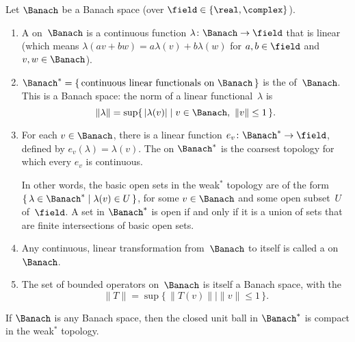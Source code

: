 \begin{defns} \label{WeakStarDefn}
Let $\Banach$ be a Banach space (over $\field \in \{\real, \complex\}$).
	\begin{enumerate}
	\item A  on~$\Banach$ is a continuous function $\lambda \colon \Banach \to \field$ that is linear (which means $\lambda (a v + b w) = a \lambda(v) + b \lambda(w)$ for $a,b \in \field$ and $v,w \in \Banach$).
	
	\item {}%
	$\Banach^* = \{\, \text{continuous linear functionals on~$\Banach$} \,\}$ is the  of~$\Banach$. This is a Banach space: the norm of a linear functional~$\lambda$ is
		$$ \| \lambda \| = \sup \{\, |\lambda(v)| \mid v \in \Banach, \ \|v\| \le 1 \,\} .$$
	
	\item For each $v \in \Banach$, there is a linear function $e_v \colon \Banach^* \to \field$, defined by $e_v(\lambda) = \lambda(v)$. The  on $\Banach^*$ is the coarsest topology for which every $e_v$ is continuous. 
	
	In other words, the basic open sets in the weak$^*$ topology are of the form 
		$ %
		\{\, \lambda \in \Banach^* \mid \lambda(v) \in U \,\}$, for some $v \in \Banach$ and some open subset~$U$ of~$\field$. A set in $\Banach^*$ is open if and only if it is a union of sets that are finite intersections of basic open sets.

	\item Any continuous, linear transformation from~$\Banach$ to itself is called a  on~$\Banach$.

	\item The set of bounded operators on~$\Banach$ is itself a Banach space, with the 
	$$ \| T \| = \sup \{\, \|T(v)\| \mid \| v \| \le 1 \,\} .$$

	\end{enumerate}
\end{defns}

\begin{prop}  \label{BanachAlaogluThm}
If $\Banach$ is any Banach space, then the closed unit ball in $\Banach ^*$ is compact in the weak$^*$ topology.
\end{prop}

